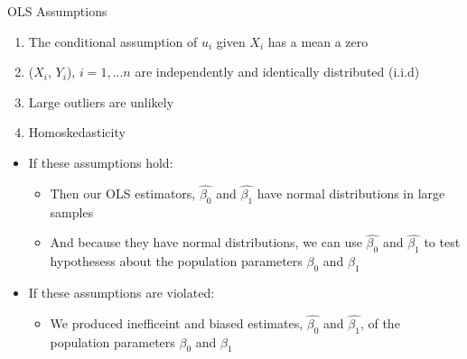 \documentclass[8pt,ignorenonframetext,dvipsnames]{beamer}
\providecommand{\tightlist}{%
  \setlength{\itemsep}{0pt}\setlength{\parskip}{0pt}}
\let\olditem\item
\renewcommand{\item}{%
  \olditem\vspace{4pt}
}
\begin{document}
\begin{frame}{OLS Assumptions}
\protect\hypertarget{ols-assumptions-1}{}

\begin{enumerate}
\tightlist
\item
  The conditional assumption of \(u_i\) given \(X_i\) has a mean a zero
\item
  (\(X_i\), \(Y_i\)), \(i=1, ...n\) are independently and identically
  distributed (i.i.d)
\item
  Large outliers are unlikely
\item
  Homoskedasticity
\end{enumerate}

\medskip

\begin{itemize}
\tightlist
\item
  If these assumptions hold:

  \begin{itemize}
  \tightlist
  \item
    Then our OLS estimators, \(\hat{\beta_0}\) and \(\hat{\beta_1}\)
    have normal distributions in large samples
  \item
    And because they have normal distributions, we can use
    \(\hat{\beta_0}\) and \(\hat{\beta_1}\) to test hypothesess about
    the population parameters \(\beta_0\) and \(\beta_1\)
  \end{itemize}
\item
  If these assumptions are violated:

  \begin{itemize}
  \tightlist
  \item
    We produced inefficeint and biased estimates, \(\hat{\beta_0}\) and
    \(\hat{\beta_1}\), of the population parameters \(\beta_0\) and
    \(\beta_1\)
  \end{itemize}
\end{itemize}

\end{frame}
\end{document}
